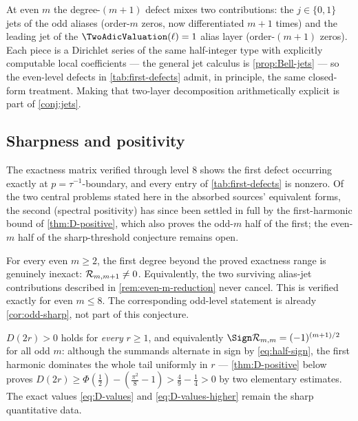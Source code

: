 \begin{remark}
At even $m$ the degree-$(m{+}1)$ defect mixes two contributions: the
$j\in\{0,1\}$ jets of the odd aliases (order-$m$ zeros, now
differentiated $m{+}1$ times) and the leading jet of the
$\TwoAdicValuation(\ell)=1$ alias layer (order-$(m{+}1)$ zeros).  Each piece is a
Dirichlet series of the same half-integer type with explicitly
computable local coefficients --- the general jet calculus is
\cref{prop:Bell-jets} --- so the even-level defects in
\cref{tab:first-defects} admit, in principle, the same closed-form
treatment.  Making that two-layer decomposition arithmetically
explicit is part of \cref{conj:jets}.
\end{remark}

\subsection{Sharpness and positivity}

The exactness matrix verified through level $8$ shows the first defect
occurring exactly at $p=\tau^{-1}$-boundary, and every entry of
\cref{tab:first-defects} is nonzero.  Of the two central problems
stated here in the absorbed sources' equivalent forms, the second
(spectral positivity) has since been settled in full by the
first-harmonic bound of \cref{thm:D-positive}, which also proves the
odd-$m$ half of the first; the even-$m$ half of the sharp-threshold
conjecture remains open.

\begin{conjecture}
\label{conj:exact-degree}
For every even $m\ge2$, the first degree beyond the proved exactness
range is genuinely inexact:
$\mathcal R_{m,m+1}\ne0$.  Equivalently, the two surviving alias-jet
contributions described in \cref{rem:even-m-reduction} never cancel.
This is verified exactly for even $m\le8$.  The corresponding odd-level
statement is already \cref{cor:odd-sharp}, not part of this conjecture.
\end{conjecture}

\begin{remark}
\label{conj:positivity}
$D(2r)>0$ holds for \emph{every} $r\ge1$, and equivalently
$\Sign\defect_{m,m}=(-1)^{(m+1)/2}$ for all odd $m$: although the
summands alternate in sign by \eqref{eq:half-sign}, the first
harmonic dominates the whole tail uniformly in $r$ ---
\cref{thm:D-positive} below proves
$D(2r)\ge\Phi(\tfrac12)-(\tfrac{\pi^2}8-1)>\tfrac49-\tfrac14>0$
by two elementary estimates.  The exact values \eqref{eq:D-values}
and \eqref{eq:D-values-higher} remain the sharp quantitative data.
\end{remark}

